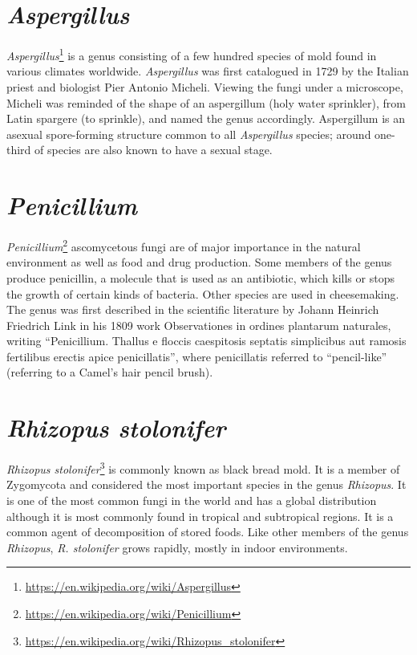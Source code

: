 \documentclass[]{book}
\let\rmarkdownfootnote\footnote%
\def\footnote{\protect\rmarkdownfootnote}
\renewcommand{\href}[2]{#2\footnote{\url{#1}}}
\theoremstyle{definition}
\theoremstyle{definition}
\theoremstyle{definition}
\theoremstyle{remark}
\begin{document}
\section{\texorpdfstring{\emph{Aspergillus}}{Aspergillus}}\label{aspergillus}

\href{https://en.wikipedia.org/wiki/Aspergillus}{\emph{Aspergillus}} is
a genus consisting of a few hundred species of mold found in various
climates worldwide. \emph{Aspergillus} was first catalogued in 1729 by the
Italian priest and biologist Pier Antonio Micheli. Viewing the fungi
under a microscope, Micheli was reminded of the shape of an aspergillum
(holy water sprinkler), from Latin spargere (to sprinkle), and named the
genus accordingly. Aspergillum is an asexual spore-forming structure
common to all \emph{Aspergillus} species; around one-third of species are also
known to have a sexual stage.

\section{\texorpdfstring{\emph{Penicillium}}{Penicillium}}\label{penicillium}

\href{https://en.wikipedia.org/wiki/Penicillium}{\emph{Penicillium}}
ascomycetous fungi are of major importance in the natural environment as
well as food and drug production. Some members of the genus produce
penicillin, a molecule that is used as an antibiotic, which kills or
stops the growth of certain kinds of bacteria. Other species are used in
cheesemaking. The genus was first described in the scientific literature
by Johann Heinrich Friedrich Link in his 1809 work Observationes in
ordines plantarum naturales, writing ``Penicillium. Thallus e floccis
caespitosis septatis simplicibus aut ramosis fertilibus erectis apice
penicillatis'', where penicillatis referred to ``pencil-like''
(referring to a Camel's hair pencil brush).

\section{\texorpdfstring{\emph{Rhizopus
stolonifer}}{Rhizopus stolonifer}}\label{rhizopus-stolonifer}

\href{https://en.wikipedia.org/wiki/Rhizopus_stolonifer}{\emph{Rhizopus
stolonifer}} is commonly known as black bread mold. It is a member of
Zygomycota and considered the most important species in the genus
\emph{Rhizopus}. It is one of the most common fungi in the world and has a
global distribution although it is most commonly found in tropical and
subtropical regions. It is a common agent of decomposition of stored
foods. Like other members of the genus \emph{Rhizopus}, \emph{R. stolonifer} grows
rapidly, mostly in indoor environments.
\end{document}
